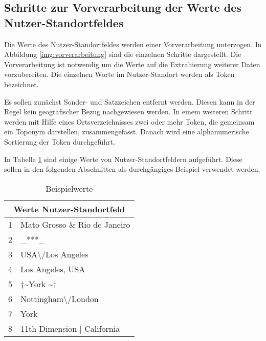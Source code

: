 		\subsection{Schritte zur Vorverarbeitung der Werte des Nutzer-Standortfeldes} \label{sub:Vorv}

			Die Werte des Nutzer-Standortfeldes werden einer Vorverarbeitung unterzogen.
			In Abbildung \ref{img:vorverarbeitung} sind die einzelnen Schritte dargestellt.
			Die Vorverarbeitung ist notwendig um die Werte auf die Extrahierung weiterer Daten vorzubereiten.
			Die einzelnen Worte im Nutzer-Standort werden als Token bezeichnet. 
			
			Es sollen zunächst Sonder- und Satzzeichen entfernt werden.
			Diesen kann in der Regel kein geografischer Bezug nachgewiesen werden.
			In einem weiteren Schritt werden mit Hilfe eines Ortsverzeichnisses zwei oder mehr Token, die gemeinsam ein Toponym darstellen, zusammengefasst.
			Danach wird eine alphanumerische Sortierung der Token durchgeführt.

			In Tabelle \ref{tab:VorverarbeitungBsp1} sind einige Werte von Nutzer-Standortfeldern aufgeführt.
			Diese sollen in den folgenden Abschnitten als durchgängiges Beispiel verwendet werden.

				\begin{table}[h]
					\centering
					\caption{Beispielwerte}
					\label{tab:VorverarbeitungBsp1}
					\begin{tabular}{|l|l|}
					\hline 
					\multicolumn{2}{|c|}{\textbf{Werte Nutzer-Standortfeld}} \\ \hline \hline
					1&Mato Grosso \& Rio de Janeiro                      			\\ \hline
					2&\_***\_                                         			\\ \hline
					3&USA\textbackslash /Los Angeles                  			\\ \hline
					4&Los Angeles, USA                                			\\ \hline
					5&$\dagger$\textasciitilde York \textasciitilde$\dagger$      \\ \hline
					6&Nottingham\textbackslash /London                			\\ \hline
					7&York                                            			\\ \hline
					8&11th Dimension | California 					\\ \hline	
					\end{tabular}
				\end{table} 
			 
